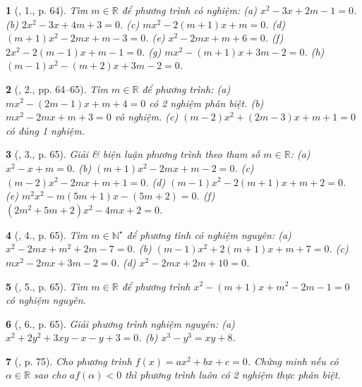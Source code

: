 \documentclass{article}
\newtheorem{baitoan}{}
\begin{document}
\begin{baitoan}[\cite{Thu_Viet_Minh_ptb2}, 1., p. 64]
	Tìm $m\in\mathbb{R}$ để phương trình có nghiệm: (a) $x^2 - 3x + 2m - 1 = 0$. (b) $2x^2 - 3x + 4m + 3 = 0$. (c) $mx^2 - 2(m + 1)x + m = 0$. (d) $(m + 1)x^2 - 2mx + m - 3 = 0$. (e) $x^2 - 2mx + m + 6 = 0$. (f) $2x^2 - 2(m - 1)x + m - 1 = 0$. (g) $mx^2 - (m + 1)x + 3m - 2 = 0$. (h) $(m - 1)x^2 - (m + 2)x + 3m - 2 = 0$.
\end{baitoan}

\begin{baitoan}[\cite{Thu_Viet_Minh_ptb2}, 2., pp. 64--65]
	Tìm $m\in\mathbb{R}$ để phương trình: (a) $mx^2 - (2m - 1)x + m + 4 = 0$ có 2 nghiệm phân biệt. (b) $mx^2 - 2mx + m + 3 = 0$ vô nghiệm. (c) $(m - 2)x^2 + (2m - 3)x + m + 1 = 0$ có đúng 1 nghiệm.
\end{baitoan}

\begin{baitoan}[\cite{Thu_Viet_Minh_ptb2}, 3., p. 65]
	Giải \& biện luận phương trình theo tham số $m\in\mathbb{R}$: (a) $x^2 - x + m = 0$. (b) $(m + 1)x^2 - 2mx + m - 2 = 0$. (c) $(m - 2)x^2 - 2mx + m + 1 = 0$. (d) $(m - 1)x^2 - 2(m + 1)x + m + 2 = 0$. (e) $m^2x^2 - m(5m + 1)x - (5m + 2) = 0$. (f) $(2m^2 + 5m + 2)x^2 - 4mx + 2 = 0$.
\end{baitoan}

\begin{baitoan}[\cite{Thu_Viet_Minh_ptb2}, 4., p. 65]
	Tìm $m\in\mathbb{N}^\star$ để phương tình có nghiệm nguyên: (a) $x^2 - 2mx + m^2 + 2m - 7 = 0$. (b) $(m - 1)x^2 + 2(m + 1)x + m + 7 = 0$. (c) $mx^2 - 2mx + 3m - 2 = 0$. (d) $x^2 - 2mx + 2m + 10 = 0$.
\end{baitoan}

\begin{baitoan}[\cite{Thu_Viet_Minh_ptb2}, 5., p. 65]
	Tìm $m\in\mathbb{R}$ để phương trình $x^2 - (m + 1)x + m^2 - 2m - 1 = 0$ có nghiệm nguyên.
\end{baitoan}

\begin{baitoan}[\cite{Thu_Viet_Minh_ptb2}, 6., p. 65]
	Giải phương trình nghiệm nguyên: (a) $x^2 + 2y^2 + 3xy - x - y + 3 = 0$. (b) $x^3 - y^3 = xy + 8$.
\end{baitoan}

\begin{baitoan}[\cite{Thu_Viet_Minh_ptb2}, p. 75]
	Cho phương trình $f(x) = ax^2 + bx + c = 0$. Chứng minh nếu có $\alpha\in\mathbb{R}$ sao cho $af(\alpha) < 0$ thì phương trình luôn có 2 nghiệm thực phân biệt.
\end{baitoan}
\end{document}
